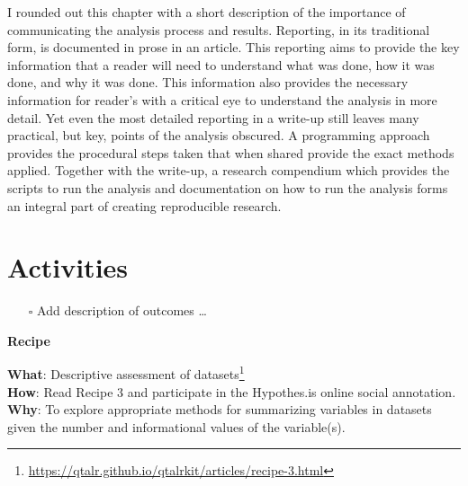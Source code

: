 \documentclass[
  letterpaper,
  DIV=11,
  numbers=noendperiod]{scrreport}
\providecommand{\tightlist}{%
  \setlength{\itemsep}{0pt}\setlength{\parskip}{0pt}}\usepackage{longtable,booktabs,array}
\theoremstyle{definition}
\theoremstyle{remark}
\DeclareRobustCommand{\href}[2]{#2\footnote{\url{#1}}}
\begin{document}
I rounded out this chapter with a short description of the importance of
communicating the analysis process and results. Reporting, in its
traditional form, is documented in prose in an article. This reporting
aims to provide the key information that a reader will need to
understand what was done, how it was done, and why it was done. This
information also provides the necessary information for reader's with a
critical eye to understand the analysis in more detail. Yet even the
most detailed reporting in a write-up still leaves many practical, but
key, points of the analysis obscured. A programming approach provides
the procedural steps taken that when shared provide the exact methods
applied. Together with the write-up, a research compendium which
provides the scripts to run the analysis and documentation on how to run
the analysis forms an integral part of creating reproducible research.

\hypertarget{activities-1}{%
\section*{Activities}\label{activities-1}}


\begin{itemize}
\tightlist
\item[$\square$]
   Add description of outcomes \ldots{}
\end{itemize}

\begin{tcolorbox}[enhanced jigsaw, breakable, colback=white, rightrule=.15mm, arc=.35mm, left=2mm, toprule=.15mm, leftrule=.75mm, bottomrule=.15mm, opacityback=0]

\textbf{ Recipe}

\textbf{What}:
\href{https://qtalr.github.io/qtalrkit/articles/recipe-3.html}{Descriptive
assessment of datasets}\\
\textbf{How}: Read Recipe 3 and participate in the Hypothes.is online
social annotation.\\
\textbf{Why}: To explore appropriate methods for summarizing variables
in datasets given the number and informational values of the
variable(s).

\end{tcolorbox}
\end{document}
